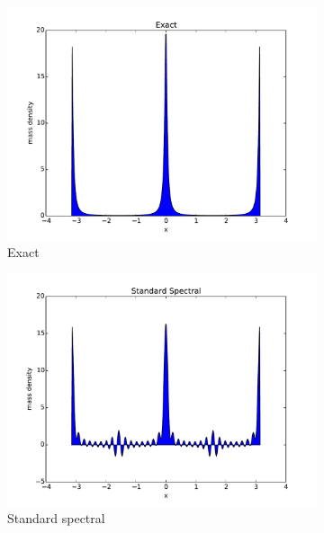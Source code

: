 \documentclass[final,leqno]{siamltex1213}
\begin{document}
\begin{figure}
	\hspace*{-.5cm}
	\begin{subfigure}{0.36\textwidth}
		\includegraphics[width=\textwidth]{./images/exact_1D.pdf}
		\caption{Exact}
		\label{fig:exact}
	\end{subfigure}
	\hspace*{-.65cm}
	\begin{subfigure}{0.36\textwidth}
		\includegraphics[width=\textwidth]{./images/standard_spectral_1D.pdf}
		\caption{Standard spectral}
		\label{fig:standard spectral}
	\end{subfigure}
	\hspace*{-.65cm}
	\begin{subfigure}{0.36\textwidth}

\end{subfigure}
\end{figure}
\end{document}
